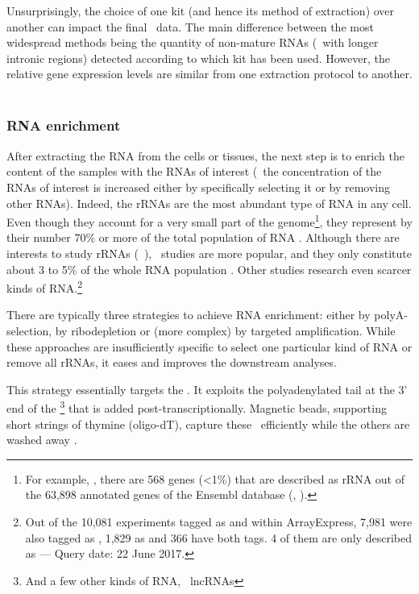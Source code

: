 Unsurprisingly, the choice of one kit (and hence its method of extraction)
over another can impact the final \Rnaseq\ data. The main difference between
the most widespread methods being the quantity of non-mature \glspl{RNA}
(\ie\ with longer intronic regions) detected according to which kit has been used.
However, the relative gene expression levels are similar from one extraction
protocol to another. \mybr\


\subsubsection{\gls{RNA} enrichment}

After extracting the \gls{RNA} from the cells or tissues,
the next step is to enrich the content of the samples with the \glspl{RNA}
of interest (\ie\ the concentration of the \glspl{RNA} of interest is increased
either by specifically selecting it or by removing other \glspl{RNA}). Indeed,
the \glspl{rRNA} are the most abundant type of \gls{RNA} in any cell. Even
though they account for a very small part of the genome\footnote{For example,
, there are 568 genes (<1\%) that are described as
\gls{rRNA} out of the 63,898 annotated genes of the \gls{Ensembl} database
(, ).}, they represent by their number 70\% or more of
the total population of \gls{RNA} .
Although there are interests to study \glspl{rRNA} (\eg{}~\cite{rrnaStudy}),
\mRNAs\ studies are more popular,
and they only constitute about 3 to 5\% of the whole \gls{RNA} population
. Other studies research even scarcer kinds of
\gls{RNA}.\footnote{Out of the 10,081 experiments tagged as  and  within \gls{ArrayExpress},
7,981 were also tagged as ,
1,829 as  and 366 have both tags.
4 of them are only described as  --- Query date: 22 June 2017.}\mybr\

There are typically three strategies to achieve \gls{RNA} enrichment:
either by polyA-selection, by ribodepletion or (more complex)
by targeted amplification. While these
approaches are insufficiently specific to select one particular kind of \gls{RNA}
or remove all \glspl{rRNA}, it eases and improves the downstream analyses.\mybr\

\label{msec:polyA}
This strategy essentially targets the \mRNAs. It exploits the polyadenylated
tail at the 3' end of the \mRNAs\footnote{And a few other kinds of \gls{RNA},
\eg\ \glspl{lncRNA} } that is added
post-transcriptionally.
Magnetic beads, supporting short strings of thymine (oligo-dT),
capture these \mRNAs\ efficiently while the others
are washed away .\mybr\

